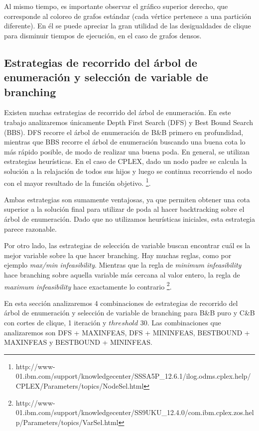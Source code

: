Al mismo tiempo, es importante observar el gráfico superior derecho, que corresponde al coloreo de grafos estándar (cada vértice pertenece a una partición diferente). En él se puede apreciar la gran utilidad de las desigualdades de clique para disminuir tiempos de ejecución, en el caso de grafos densos. 

\subsection{Estrategias de recorrido del árbol de enumeración
y selección de variable de branching}

Existen muchas estrategias de recorrido del árbol de enumeración. En este trabajo analizaremos únicamente Depth First Search (DFS) y Best Bound Search (BBS). DFS recorre el árbol de enumeración de B\&B primero en profundidad, mientras que BBS recorre el árbol de enumeración buscando una buena cota lo más rápido posible, de modo de realizar una buena poda. En general, se utilizan estrategias heurísticas. En el caso de CPLEX, dado un nodo padre se calcula la solución a la relajación de todos sus hijos y luego se continua recorriendo el nodo con el mayor resultado de la función objetivo. \footnote{http://www-01.ibm.com/support/knowledgecenter/SSSA5P\_12.6.1/ilog.odms.cplex.help/CPLEX/Parameters/topics/NodeSel.html}.

Ambas estrategias son sumamente ventajosas, ya que permiten obtener una cota superior a la solución final para utilizar de poda al hacer backtracking sobre el árbol de enumeración. Dado que no utilizamos heurísticas iniciales, esta estrategia parece razonable. 

Por otro lado, las estrategias de selección de variable buscan encontrar cuál es la mejor variable sobre la que hacer branching. Hay muchas reglas, como por ejemplo \textit{max/min infeasibility}. Mientras que la regla de \textit{minimum infeasibility} hace branching sobre aquella variable más cercana al valor entero, la regla de \textit{maximum infeasibility} hace exactamente lo contrario \footnote{http://www-01.ibm.com/support/knowledgecenter/SS9UKU\_12.4.0/com.ibm.cplex.zos.help/Parameters/topics/VarSel.html}.

En esta sección analizaremos 4 combinaciones de estrategias de recorrido del árbol de enumeración y selección de variable de branching para B\&B puro y C\&B con cortes de clique, 1 iteración y $threshold$ 30. Las combinaciones que analizaremos son DFS + MAXINFEAS, DFS + MININFEAS, BESTBOUND + MAXINFEAS y BESTBOUND + MININFEAS.

